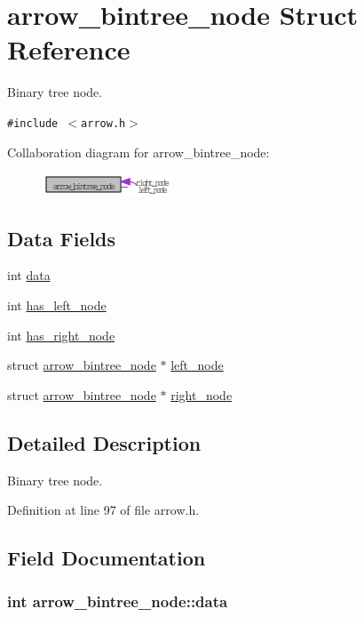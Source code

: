 \hypertarget{structarrow__bintree__node}{
\section{arrow\_\-bintree\_\-node Struct Reference}
\label{structarrow__bintree__node}
}
Binary tree node.  


{\tt \#include $<$arrow.h$>$}

Collaboration diagram for arrow\_\-bintree\_\-node:\nopagebreak
\begin{figure}[H]
\begin{center}
\leavevmode
\includegraphics[width=109pt]{structarrow__bintree__node__coll__graph}
\end{center}
\end{figure}
\subsection*{Data Fields}
\begin{CompactItemize}
\item 
int \hyperlink{structarrow__bintree__node_de01c6e7aa823db027836d77e7ce48b6}{data}
\item 
int \hyperlink{structarrow__bintree__node_a359d3d029023fb8763af3329207ee53}{has\_\-left\_\-node}
\item 
int \hyperlink{structarrow__bintree__node_f6f8bb35c520a88841a810777e9bc186}{has\_\-right\_\-node}
\item 
struct \hyperlink{structarrow__bintree__node}{arrow\_\-bintree\_\-node} $\ast$ \hyperlink{structarrow__bintree__node_e7eb125cad02704a57796b16c49b2983}{left\_\-node}
\item 
struct \hyperlink{structarrow__bintree__node}{arrow\_\-bintree\_\-node} $\ast$ \hyperlink{structarrow__bintree__node_4875801983f2b0220212951e6c0130af}{right\_\-node}
\end{CompactItemize}


\subsection{Detailed Description}
Binary tree node. 

Definition at line 97 of file arrow.h.

\subsection{Field Documentation}
\hypertarget{structarrow__bintree__node_de01c6e7aa823db027836d77e7ce48b6}{
\subsubsection{\setlength{\rightskip}{0pt plus 5cm}int {\bf arrow\_\-bintree\_\-node::data}}}
\label{structarrow__bintree__node_de01c6e7aa823db027836d77e7ce48b6}


